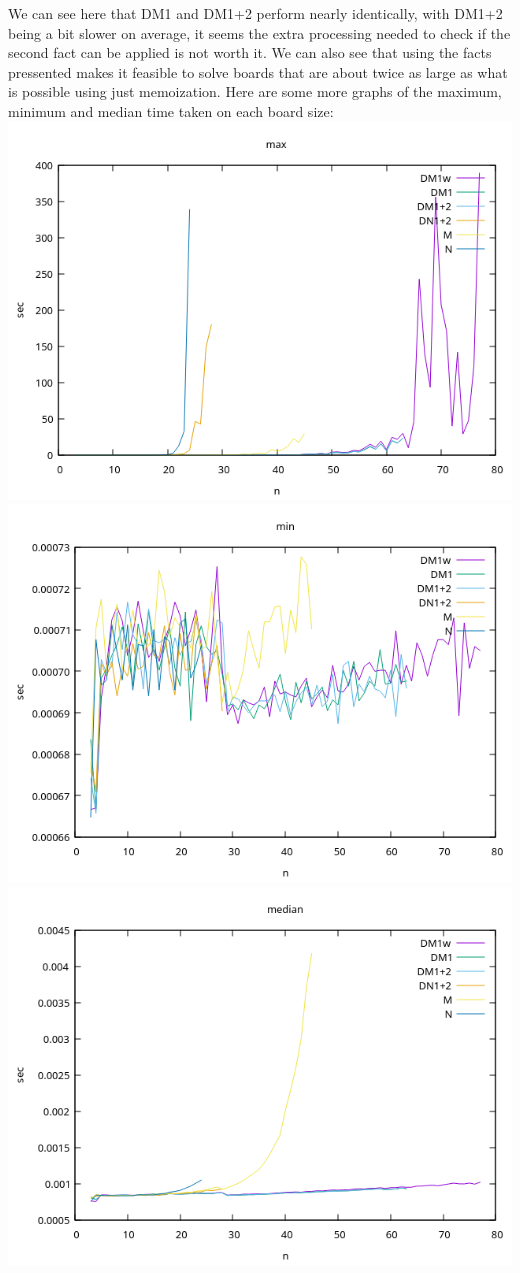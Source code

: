 \documentclass{article}
\begin{document}
We can see here that DM1 and DM1+2 perform nearly identically, with DM1+2 being a bit slower on average, it seems the extra processing needed to check if the second fact can be applied is not worth it. We can also see that using the facts pressented makes it feasible to solve boards that are about twice as large as what is possible using just memoization. 
Here are some more graphs of the maximum, minimum and median time taken on each board size:
\includegraphics[width=\textwidth]{./cpp_comparison_max}
\includegraphics[width=\textwidth]{./cpp_comparison_min}
\includegraphics[width=\textwidth]{./cpp_comparison_med}
\end{document}
